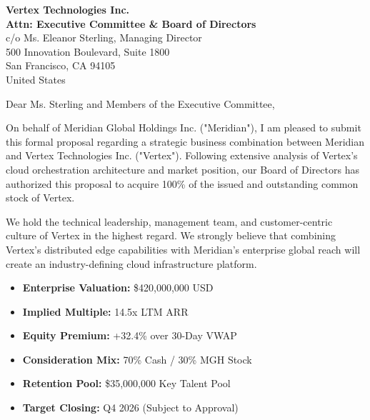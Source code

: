 \documentclass[
  paper=a4,
  fontsize=10pt,
  foldmarks=true,
  foldmarks=BmLNT,
  fromalign=right,
  fromrule=false,
  parskip=half,
  locfield=wide
]{scrlttr2}
\begin{document}
\begin{letter}{%
  \textbf{Vertex Technologies Inc.}\\
  \textbf{Attn: Executive Committee \& Board of Directors}\\
  c/o Ms. Eleanor Sterling, Managing Director\\
  500 Innovation Boulevard, Suite 1800\\
  San Francisco, CA 94105\\
  United States
}

\opening{Dear Ms. Sterling and Members of the Executive Committee,}

On behalf of Meridian Global Holdings Inc. ("Meridian"), I am pleased to submit this formal proposal regarding a strategic business combination between Meridian and Vertex Technologies Inc. ("Vertex"). Following extensive analysis of Vertex's cloud orchestration architecture and market position, our Board of Directors has authorized this proposal to acquire 100\% of the issued and outstanding common stock of Vertex.

We hold the technical leadership, management team, and customer-centric culture of Vertex in the highest regard. We strongly believe that combining Vertex's distributed edge capabilities with Meridian's enterprise global reach will create an industry-defining cloud infrastructure platform.

\vspace{0.5mm}
\begin{tcolorbox}[executivebox, title={\faChartLine\ Transaction Highlights \& Proposed Valuation}]
  \begin{minipage}[t]{0.48\textwidth}
    \begin{itemize}\setlength{\itemsep}{1pt}\parskip0pt
      \item[\small\color{AccentGold}\faCheckCircle] \textbf{Enterprise Valuation:} \$420,000,000 USD
      \item[\small\color{AccentGold}\faCheckCircle] \textbf{Implied Multiple:} 14.5x LTM ARR
      \item[\small\color{AccentGold}\faCheckCircle] \textbf{Equity Premium:} +32.4\% over 30-Day VWAP
    \end{itemize}
  \end{minipage}%
  \hfill
  \begin{minipage}[t]{0.48\textwidth}
    \begin{itemize}\setlength{\itemsep}{1pt}\parskip0pt
      \item[\small\color{AccentGold}\faCheckCircle] \textbf{Consideration Mix:} 70\% Cash / 30\% MGH Stock
      \item[\small\color{AccentGold}\faCheckCircle] \textbf{Retention Pool:} \$35,000,000 Key Talent Pool
      \item[\small\color{AccentGold}\faCheckCircle] \textbf{Target Closing:} Q4 2026 (Subject to Approval)
    \end{itemize}
  \end{minipage}
\end{tcolorbox}


\end{letter}
\end{document}
